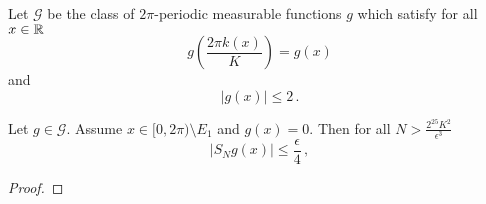 {Let $\mathcal{G}$ be the class of $2\pi$-periodic measurable functions $g$ which satisfy for all $x\in \mathbb{R}$
\begin{equation}
   g(\frac{2\pi k(x)}K)=g(x)
\end{equation}
and
\begin{equation}
   |g(x)|\le 2\, .
\end{equation}



\begin{lemma}\label{lem g with zero}
Let $g\in \mathcal{G}$. Assume
$x\in [0,2\pi)\setminus E_1 $ and $g(x)=0$.
Then for all $N>\frac {2^{25} K^2}{\epsilon^3}$
\begin{equation}\label{single char f}
|S_Ng(x)|\le \frac \epsilon 4\, ,
\end{equation}
\end{lemma}
\begin{proof}







\end{proof}}
